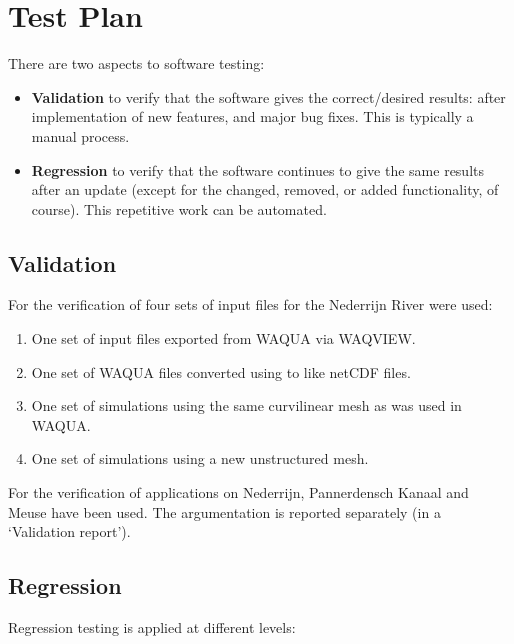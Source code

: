 \chapter{Test Plan} \label{Chp:TestPlan}

There are two aspects to software testing:

\begin{itemize}
\item \textbf{Validation} to verify that the software gives the correct/desired results: after implementation of new features, and major bug fixes.
This is typically a manual process.
\item \textbf{Regression} to verify that the software continues to give the same results after an update (except for the changed, removed, or added functionality, of course).
This repetitive work can be automated.
\end{itemize}


\section{Validation}

For the verification of  four sets of input files for the Nederrijn River were used:

\begin{enumerate}
\item One set of input files exported from WAQUA via WAQVIEW.
\item One set of WAQUA files converted using  to \dflowfm like netCDF files.
\item One set of \dflowfm simulations using the same curvilinear mesh as was used in WAQUA.
\item One set of \dflowfm simulations using a new unstructured mesh.
\end{enumerate}

For the verification of  applications on Nederrijn, Pannerdensch Kanaal and Meuse have been used.
The argumentation is reported separately (in a `Validation report').


\section{Regression}

Regression testing is applied at different levels:

